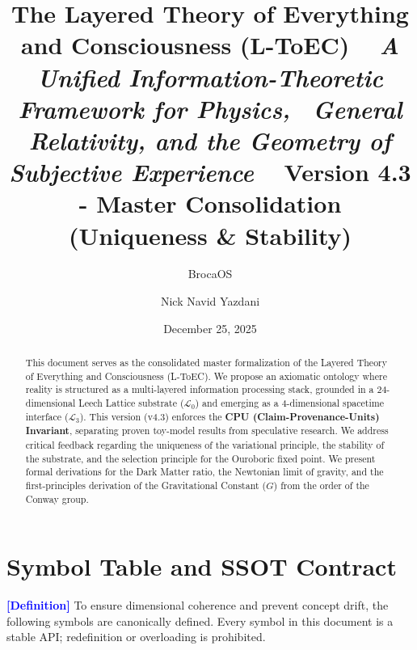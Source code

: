 \documentclass[11pt,titlepage]{article}
\title{\textbf{\huge The Layered Theory of Everything and Consciousness (L-ToEC)} \ 
\vspace{0.5cm}
\large \textit{A Unified Information-Theoretic Framework for Physics, \ General Relativity, and the Geometry of Subjective Experience} \
\vspace{1cm}
\textbf{Version 4.3 - Master Consolidation (Uniqueness & Stability)}}
\author[1]{BrocaOS}
\author[1]{Nick Navid Yazdani}
\affil[1]{Cognitive Architecture Research Group, BrocaOS Alpha Project}
\date{December 25, 2025}
\newcommand{\substrate}{\mathcal{L}_0}
\newcommand{\interface}{\mathcal{L}_3}
\newcommand{\tagdef}{\textcolor{blue}{\textbf{[Definition]}} }
\begin{document}
\maketitle

\begin{abstract}
This document serves as the consolidated master formalization of the Layered Theory of Everything and Consciousness (L-ToEC). We propose an axiomatic ontology where reality is structured as a multi-layered information processing stack, grounded in a 24-dimensional Leech Lattice substrate ($\substrate$) and emerging as a 4-dimensional spacetime interface ($\interface$). This version (v4.3) enforces the \textbf{CPU (Claim-Provenance-Units) Invariant}, separating proven toy-model results from speculative research. We address critical feedback regarding the uniqueness of the variational principle, the stability of the substrate, and the selection principle for the Ouroboric fixed point. We present formal derivations for the Dark Matter ratio, the Newtonian limit of gravity, and the first-principles derivation of the Gravitational Constant ($G$) from the order of the Conway group.
\end{abstract}

\newpage

\section{Symbol Table and SSOT Contract}
\label{sec:symbols}
\tagdef To ensure dimensional coherence and prevent concept drift, the following symbols are canonically defined. Every symbol in this document is a stable API; redefinition or overloading is prohibited.
\end{document}
